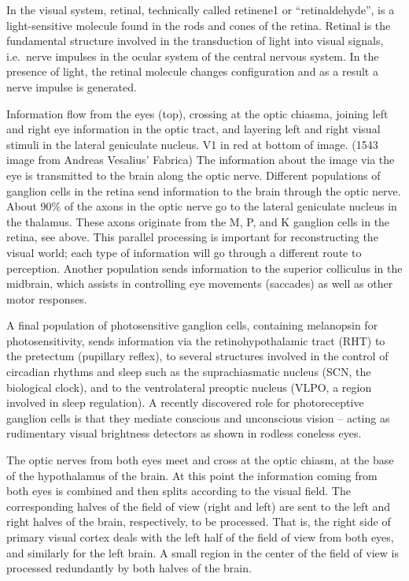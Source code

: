 In the visual system, retinal, technically called retinene1 or ``retinaldehyde'', is a light-sensitive molecule found in the rods and cones of the retina. Retinal is the fundamental structure involved in the transduction of light into visual signals, i.e.~nerve impulses in the ocular system of the central nervous system. In the presence of light, the retinal molecule changes configuration and as a result a nerve impulse is generated.

Information flow from the eyes (top), crossing at the optic chiasma, joining left and right eye information in the optic tract, and layering left and right visual stimuli in the lateral geniculate nucleus. V1 in red at bottom of image. (1543 image from Andreas Vesalius' Fabrica)
The information about the image via the eye is transmitted to the brain along the optic nerve. Different populations of ganglion cells in the retina send information to the brain through the optic nerve. About 90\% of the axons in the optic nerve go to the lateral geniculate nucleus in the thalamus. These axons originate from the M, P, and K ganglion cells in the retina, see above. This parallel processing is important for reconstructing the visual world; each type of information will go through a different route to perception. Another population sends information to the superior colliculus in the midbrain, which assists in controlling eye movements (saccades) as well as other motor responses.

A final population of photosensitive ganglion cells, containing melanopsin for photosensitivity, sends information via the retinohypothalamic tract (RHT) to the pretectum (pupillary reflex), to several structures involved in the control of circadian rhythms and sleep such as the suprachiasmatic nucleus (SCN, the biological clock), and to the ventrolateral preoptic nucleus (VLPO, a region involved in sleep regulation). A recently discovered role for photoreceptive ganglion cells is that they mediate conscious and unconscious vision -- acting as rudimentary visual brightness detectors as shown in rodless coneless eyes.

The optic nerves from both eyes meet and cross at the optic chiasm, at the base of the hypothalamus of the brain. At this point the information coming from both eyes is combined and then splits according to the visual field. The corresponding halves of the field of view (right and left) are sent to the left and right halves of the brain, respectively, to be processed. That is, the right side of primary visual cortex deals with the left half of the field of view from both eyes, and similarly for the left brain. A small region in the center of the field of view is processed redundantly by both halves of the brain.

